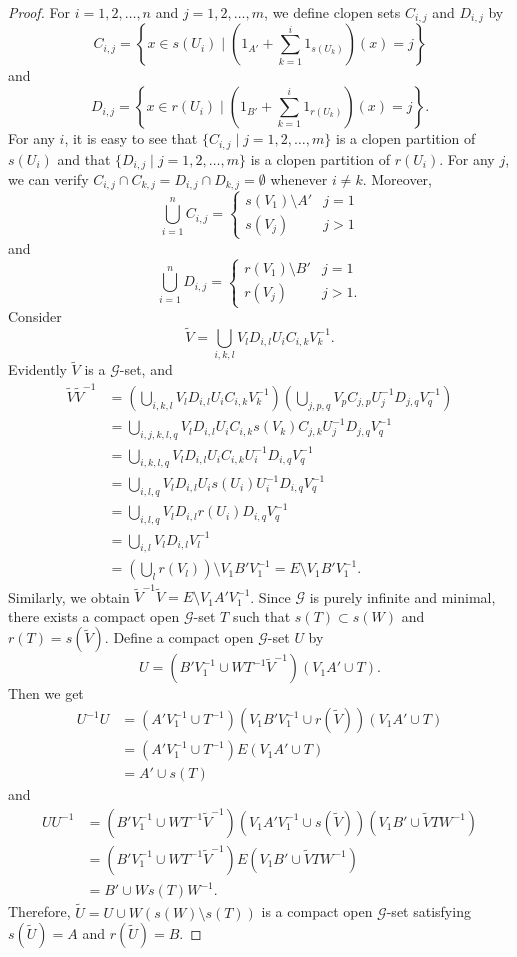 \documentclass[11pt]{article}
\theoremstyle{definition}
\numberwithin{equation}{section}
\newcommand{\G}{\mathcal{G}}
\begin{document}
\begin{proof}
For $i=1,2,\dots,n$ and $j=1,2,\dots,m$, 
we define clopen sets $C_{i,j}$ and $D_{i,j}$ by 
\[
C_{i,j}=\left\{x\in s(U_i)\mid
\left(1_{A'}+\sum_{k=1}^i1_{s(U_k)}\right)(x)=j\right\}
\]
and 
\[
D_{i,j}=\left\{x\in r(U_i)\mid
\left(1_{B'}+\sum_{k=1}^i1_{r(U_k)}\right)(x)=j\right\}. 
\]
For any $i$, it is easy to see that 
$\{C_{i,j}\mid j=1,2,\dots,m\}$ is a clopen partition of $s(U_i)$ and 
that $\{D_{i,j}\mid j=1,2,\dots,m\}$ is a clopen partition of $r(U_i)$. 
For any $j$, we can verify 
$C_{i,j}\cap C_{k,j}=D_{i,j}\cap D_{k,j}=\emptyset$ whenever $i\neq k$. 
Moreover, 
\[
\bigcup_{i=1}^nC_{i,j}
=\begin{cases}s(V_1)\setminus A'&j=1\\
s(V_j)&j>1\end{cases}
\]
and 
\[
\bigcup_{i=1}^nD_{i,j}
=\begin{cases}r(V_1)\setminus B'&j=1\\
r(V_j)&j>1. \end{cases}
\]
Consider 
\[
\widetilde{V}=\bigcup_{i,k,l}V_lD_{i,l}U_iC_{i,k}V_k^{-1}. 
\]
Evidently $\widetilde{V}$ is a $\G$-set, and 
\begin{align*}
\widetilde{V}\widetilde{V}^{-1}
&=\left(\bigcup_{i,k,l}V_lD_{i,l}U_iC_{i,k}V_k^{-1}\right)
\left(\bigcup_{j,p,q}V_pC_{j,p}U_j^{-1}D_{j,q}V_q^{-1}\right)\\
&=\bigcup_{i,j,k,l,q}V_lD_{i,l}U_iC_{i,k}s(V_k)C_{j,k}U_j^{-1}D_{j,q}V_q^{-1}\\
&=\bigcup_{i,k,l,q}V_lD_{i,l}U_iC_{i,k}U_i^{-1}D_{i,q}V_q^{-1}\\
&=\bigcup_{i,l,q}V_lD_{i,l}U_is(U_i)U_i^{-1}D_{i,q}V_q^{-1}\\
&=\bigcup_{i,l,q}V_lD_{i,l}r(U_i)D_{i,q}V_q^{-1}\\
&=\bigcup_{i,l}V_lD_{i,l}V_l^{-1}\\
&=\left(\bigcup_lr(V_l)\right)\setminus V_1B'V_1^{-1}
=E\setminus V_1B'V_1^{-1}. 
\end{align*}
Similarly, we obtain 
$\widetilde{V}^{-1}\widetilde{V}=E\setminus V_1A'V_1^{-1}$. 
Since $\G$ is purely infinite and minimal, 
there exists a compact open $\G$-set $T$ 
such that $s(T)\subset s(W)$ and $r(T)=s(\tilde V)$. 
Define a compact open $\G$-set $U$ by 
\[
U=(B'V_1^{-1}\cup WT^{-1}\widetilde V^{-1})(V_1A'\cup T). 
\]
Then we get 
\begin{align*}
U^{-1}U
&=(A'V_1^{-1}\cup T^{-1})
(V_1B'V_1^{-1}\cup r(\widetilde V))(V_1A'\cup T)\\
&=(A'V_1^{-1}\cup T^{-1})E(V_1A'\cup T)\\
&=A'\cup s(T)
\end{align*}
and 
\begin{align*}
UU^{-1}
&=(B'V_1^{-1}\cup WT^{-1}\widetilde V^{-1})
(V_1A'V_1^{-1}\cup s(\widetilde V))(V_1B'\cup \widetilde VTW^{-1})\\
&=(B'V_1^{-1}\cup WT^{-1}\widetilde V^{-1})E
(V_1B'\cup \widetilde VTW^{-1})\\
&=B'\cup Ws(T)W^{-1}. 
\end{align*}
Therefore, 
$\widetilde U=U\cup W(s(W)\setminus s(T))$ is a compact open $\G$-set 
satisfying $s(\widetilde U)=A$ and $r(\widetilde U)=B$. 
\end{proof}
\end{document}
